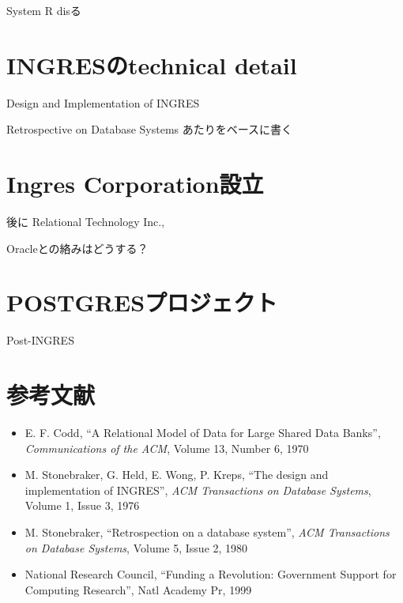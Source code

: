 System R disる

\section{INGRESのtechnical detail}

Design and Implementation of INGRES

Retrospective on Database Systems あたりをベースに書く

\section{Ingres Corporation設立}

後に Relational Technology Inc.,

Oracleとの絡みはどうする？

\section{POSTGRESプロジェクト}

Post-INGRES

\section*{参考文献}

\begin{itemize}
 \item E. F. Codd, ``A Relational Model of Data for Large Shared Data
       Banks'', {\it Communications of the ACM}, Volume 13, Number 6,
       1970
 \item M. Stonebraker, G. Held, E. Wong, P. Kreps, ``The design and
       implementation of INGRES'', {\it ACM Transactions on Database
       Systems},
Volume 1, Issue 3, 1976
 \item M. Stonebraker, ``Retrospection on a database system'', {\it ACM
       Transactions on Database Systems}, Volume 5, Issue 2, 1980
 \item National Research Council, ``Funding a Revolution: Government
       Support for Computing Research'', Natl Academy Pr, 1999
\end{itemize}